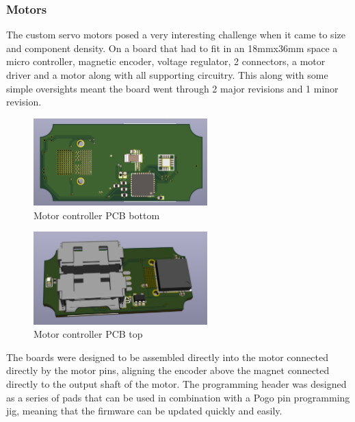 \subsubsection{Motors}
The custom servo motors posed a very interesting challenge when it came to size and component density. On a board that had to fit in an 18mmx36mm space a micro controller, magnetic encoder, voltage regulator, 2 connectors, a motor driver and a motor along with all supporting circuitry. This along with some simple oversights meant the board went through 2 major revisions and 1 minor revision. 

\begin{figure}[H]
       \centering
       \includegraphics[width=0.6\textwidth]{figures/MotorControllerBottom.png}
       \caption{Motor controller PCB bottom}
       \label{fig:MotortControllerPCBBottom}
   \end{figure}
   \begin{figure}[H]
       \centering
       \includegraphics[width=0.6\textwidth]{figures/MotorControllerTop.png}
       \caption{Motor controller PCB top}
       \label{fig:MotorControllerPCBTop}
   \end{figure}
The boards were designed to be assembled directly into the motor connected directly by the motor pins, aligning the encoder above the magnet connected directly to the output shaft of the motor. The programming header was designed as a series of pads that can be used in combination with a Pogo pin programming jig, meaning that the firmware can be updated quickly and easily. 
